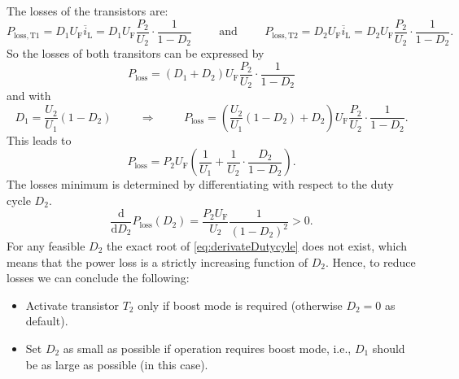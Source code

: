 \begin{solutionblock}
	The losses of the transistors are:
	\begin{equation}
		P_\mathrm{loss,T1}=D_1 U_\mathrm{F} \overline{i}_\mathrm{L}=D_1 U_\mathrm{F} \frac{P_\mathrm{2}}{U_\mathrm{2}} \cdot \frac{1}{1-D_2}
		\hspace{1cm} \mathrm{and} \hspace{1cm}
		P_\mathrm{loss,T2}=D_2 U_\mathrm{F} \overline{i}_\mathrm{L}=D_2 U_\mathrm{F} \frac{P_\mathrm{2}}{U_\mathrm{2}} \cdot \frac{1}{1-D_2}.
	\end{equation}
	So the losses of both transitors can be expressed by
	\begin{equation}
		P_\mathrm{loss}=\left(D_1 +D_2\right) U_\mathrm{F} \frac{P_\mathrm{2}}{U_\mathrm{2}} \cdot \frac{1}{1-D_2}
	\end{equation}
	and with
	\begin{equation}
		D_1 =\frac{U_\mathrm{2}}{U_\mathrm{1}} \left(1 - D_2 \right)
		\hspace{1cm} \Rightarrow \hspace{1cm}
		P_\mathrm{loss}=\left(\frac{U_\mathrm{2}}{U_\mathrm{1}} \left(1 - D_2 \right)+D_2\right) U_\mathrm{F} \frac{P_\mathrm{2}}{U_\mathrm{2}} \cdot \frac{1}{1-D_2}.
	\end{equation}
	This leads to
	\begin{equation}
		P_\mathrm{loss}=P_\mathrm{2} U_\mathrm{F} \left(\frac{1}{U_\mathrm{1}} +
		\frac{1}{U_\mathrm{2}} \cdot \frac{D_2}{1-D_2}\right).
		\label{eq:ploss}
	\end{equation}
	The losses minimum is determined by differentiating with respect to the duty cycle $D_2$.
	\begin{equation}
		\frac{\mathrm{d}}{\mathrm{d}D_2} P_\mathrm{loss}(D_2)= \frac{P_2 U_\mathrm{F}}{U_2}\frac{1}{\left(1 - D_2 \right)^2} > 0.
		\label{eq:derivateDutycyle}
	\end{equation}
	For any feasible $D_2$ the exact root of \eqref{eq:derivateDutycyle} does not exist, which means that the power loss is a strictly increasing function of $D_2$. Hence, to reduce losses we can conclude the following:
	\begin{itemize}
		\item Activate transistor $T_2$ only if boost mode is required (otherwise $D_2=0$ as default).
		\item Set $D_2$ as small as possible if operation requires boost mode, i.e., $D_1$ should be as large as possible (in this case).
	\end{itemize}
\end{solutionblock}

